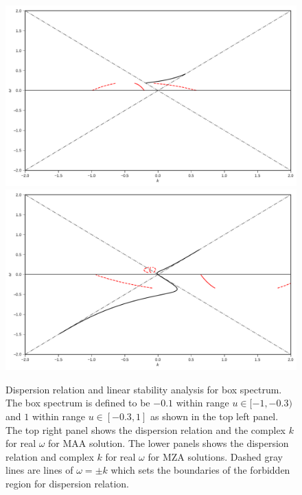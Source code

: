 \documentclass[%
preprint,
 amsmath,amssymb,
 aps,
 prd
]{revtex4-1}
\begin{document}
\begin{figure}
   \includegraphics[width=\linewidth]{assets/spectBoxC1MAADRPltBlob.pdf}
   \endminipage\hfill
   \includegraphics[width=\linewidth]{assets/spectBoxC1MZADRPltBlob.pdf}
   \endminipage\hfill
   \caption{Dispersion relation and linear stability analysis for box spectrum. The box spectrum is defined to be $-0.1$ within range $u\in [-1,-0.3)$ and $1$ within range $u\in [-0.3,1]$ as shown in the top left panel. The top right panel shows the dispersion relation and the complex $k$ for real $\omega$ for MAA solution. The lower panels shows the dispersion relation and complex $k$ for real $\omega$ for MZA solutions. Dashed gray lines are lines of $\omega= \pm k$ which sets the boundaries of the forbidden region for dispersion relation.
    }
   \label{fig-box-c1}
\end{figure}
\end{document}
